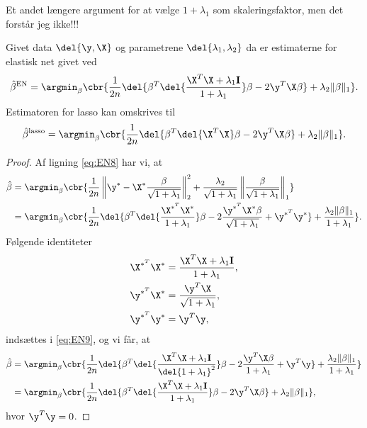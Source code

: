 Et andet længere argument for at vælge \(1+\lambda_1\) som skaleringsfaktor, men det forstår jeg ikke!!!
%
\begin{thm} \label{thm:elastisk_net2}
Givet data \(\del{\y, \X}\) og parametrene \(\del{\lambda_1, \lambda_2}\) da er estimaterne for elastisk net givet ved
\begin{align}
\hat{\beta}^\text{EN} = \argmin_\beta \cbr{ \frac{1}{2n} \del{\beta^T \del{\frac{\X^T \X + \lambda_1 \mathbf{I}}{1 + \lambda_1}} \beta - 2 \y^T \X \beta} + \lambda_2 \Vert \beta \Vert_1}. \label{eq:EN6}
\end{align}
Estimatoren for lasso kan omskrives til
\begin{align}
\hat{\beta}^\text{lasso} = \argmin_\beta \cbr{ \frac{1}{2n} \del{ \beta^T \del{\X^T \X} \beta - 2 \y^T \X \beta } + \lambda_2 \Vert \beta \Vert_1}. \label{eq:EN7}
\end{align}
\end{thm}
\begin{proof}
Af ligning \eqref{eq:EN8} har vi, at
\begin{align}
\hat{\beta} &= \argmin_{\beta} \cbr{\frac{1}{2n} \left\Vert \y^* - \X^* \frac{\beta}{\sqrt{1+\lambda_1}} \right\Vert_2^2 + \frac{\lambda_2}{\sqrt{1+\lambda_1}} \left\Vert \frac{\beta}{\sqrt{1+\lambda_1}} \right\Vert_1} \nonumber \\
&=\argmin_{\beta} \cbr{\frac{1}{2n} \del{\beta^T \del{\frac{\X^{*^T} \X^*}{1+\lambda_1}} \beta - 2 \frac{\y^{*^T} \X^* \beta}{\sqrt{1+\lambda_1}} + \y^{*^T} \y^*} + \frac{\lambda_2 \Vert \beta \Vert_1}{1+\lambda_1}}. \label{eq:EN9}
\end{align}
Følgende identiteter
\begin{align*}
\X^{*^T} \X^* &= \frac{\X^T \X + \lambda_1 \mathbf{I}}{1+ \lambda_1}, \\
\y^{*^T} \X^* &= \frac{\y^T \X}{\sqrt{1+\lambda_1}} ,\\
\y^{*^T} \y^* &= \y^T \y, 
\end{align*}
indsættes i \eqref{eq:EN9}, og vi får, at
\begin{align*}
\hat{\beta} &= \argmin_{\beta} \cbr{\frac{1}{2n} \del{\beta^T \del{\frac{\X^T \X + \lambda_1 \mathbf{I}}{\del{1+\lambda_1}^2}} \beta - 2 \frac{\y^T \X \beta}{1+\lambda_1} + \y^T \y} + \frac{\lambda_2 \Vert \beta \Vert_1}{1+\lambda_1}} \\ 
&= \argmin_{\beta} \cbr{ \frac{1}{2n} \del{\beta^T \del{\frac{\X^T \X + \lambda_1\mathbf{I}}{1+ \lambda_1}} \beta - 2 \y^T \X \beta} + \lambda_2 \Vert \beta \Vert_1},
\end{align*}
hvor \(\y^T \y= 0 \).
\end{proof}
